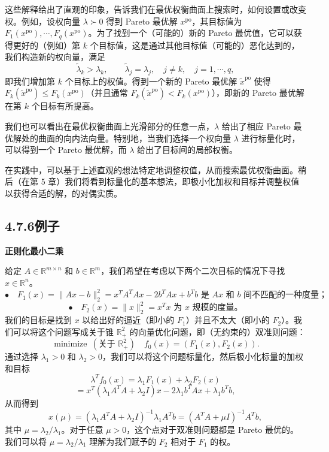 \documentclass[UTF8,12pt,a4paper,fontset=fandol]{ctexart}
\begin{document}
这些解释给出了直观的印象，告诉我们在最优权衡曲面上搜索时，如何设置或改变权。例如，设权向量 $\lambda\succ 0$ 得到 Pareto 最优解 $x^{\mathrm{po}}$，其目标值为 $F_1(x^{\mathrm{po}}),\cdots,F_q(x^{\mathrm{po}})$。为了找到一个（可能的）新的 Pareto 最优值，它可以获得更好的（例如）第 $k$ 个目标值，这是通过其他目标值（可能的）恶化达到的，我们构造新的权向量，满足
\[
\tilde{\lambda}_k>\lambda_k,\qquad \tilde{\lambda}_j=\lambda_j,\quad j\neq k,\quad j=1,\cdots,q,
\]
即我们增加第 $k$ 个目标上的权值。得到一个新的 Pareto 最优解 $\tilde{x}^{\mathrm{po}}$ 使得 $F_k(\tilde{x}^{\mathrm{po}})\leq F_k(x^{\mathrm{po}})$（并且通常 $F_k(\tilde{x}^{\mathrm{po}})<F_k(x^{\mathrm{po}})$），即新的 Pareto 最优解在第 $k$ 个目标有所提高。

我们也可以看出在最优权衡曲面上光滑部分的任意一点，$\lambda$ 给出了相应 Pareto 最优解处的曲面的向内法向量。特别地，当我们选择一个权向量 $\lambda$ 进行标量化时，可以得到一个 Pareto 最优解，而 $\lambda$ 给出了目标间的局部权衡。

在实践中，可以基于上述直观的想法特定地调整权值，从而搜索最优权衡曲面。稍后（在第 5 章）我们将看到标量化的基本想法，即极小化加权和目标并调整权值以获得合适的解，的对偶实质。

\subsection*{4.7.6\quad 例子}

\noindent\textbf{正则化最小二乘}

给定 $A\in\mathbb{R}^{m\times n}$ 和 $b\in\mathbb{R}^m$，我们希望在考虑以下两个二次目标的情况下寻找 $x\in\mathbb{R}^n$。
\[
\bullet\quad F_1(x)=\|Ax-b\|_2^2=x^TA^TAx-2b^TAx+b^Tb\text{ 是 }Ax\text{ 和 }b\text{ 间不匹配的一种度量；}
\]
\[
\bullet\quad F_2(x)=\|x\|_2^2=x^Tx\text{ 为 }x\text{ 规模的度量。}
\]
我们的目标是找到 $x$ 以给出好的逼近（即小的 $F_1$）并且不太大（即小的 $F_2$）。我们可以将这个问题写成关于锥 $\mathbb{R}_+^2$ 的向量优化问题，即（无约束的）双准则问题：
\[
\mathop{\mathrm{minimize}}\ (\text{关于 }\mathbb{R}_+^2)\quad f_0(x)=(F_1(x),F_2(x)).
\]
通过选择 $\lambda_1>0$ 和 $\lambda_2>0$，我们可以将这个问题标量化，然后极小化标量的加权和目标
\[
\lambda^Tf_0(x)=\lambda_1F_1(x)+\lambda_2F_2(x)
\]
\[
=x^T(\lambda_1A^TA+\lambda_2I)x-2\lambda_1b^TAx+\lambda_1b^Tb,
\]
从而得到
\[
x(\mu)=(\lambda_1A^TA+\lambda_2I)^{-1}\lambda_1A^Tb=(A^TA+\mu I)^{-1}A^Tb,
\]
其中 $\mu=\lambda_2/\lambda_1$。对于任意 $\mu>0$，这个点对于双准则问题都是 Pareto 最优的。我们可以将 $\mu=\lambda_2/\lambda_1$ 理解为我们赋予的 $F_2$ 相对于 $F_1$ 的权。
\end{document}
